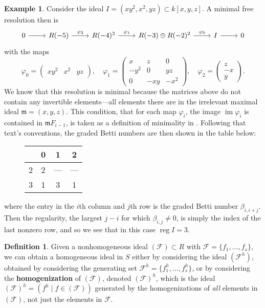 \documentclass[11pt]{article}
\newcommand{\F}{\mathcal{F}}
\DeclareMathOperator{\reg}{reg}
\DeclareMathOperator{\im}{im}
\theoremstyle{definition}
\newtheorem{definition}{Definition}
\newtheorem{example}{Example}
\begin{document}
\begin{example}
	Consider the ideal $I = (xy^2, x^2, yz) \subset k[x,y,z]$. A minimal free resolution then is \[ \begin{tikzcd}
		0 \arrow[r] & R(-5) \arrow[r, "\varphi_2"] & R(-4)^3 \arrow[r, "\varphi_1"] & R(-3) \oplus R(-2)^2 \arrow[r, "\varphi_0"] & I \arrow[r] & 0
	\end{tikzcd} \] with the maps \[ \varphi_0 = \begin{pmatrix}
		xy^2 & x^2 & yz
	\end{pmatrix}, \quad \varphi_1 = \begin{pmatrix}
		x & z & 0 \\
		-y^2 & 0 & yz \\
		0 & -xy & -x^2
	\end{pmatrix}, \quad \varphi_2 = \begin{pmatrix}
		z \\
		-x \\
		y
	\end{pmatrix}. \] We know that this resolution is minimal because the matrices above do not contain any invertible elements---all elements there are in the irrelevant maximal ideal $\mathfrak{m} = (x,y,z)$. This condition, that for each map $\varphi_i$, the image $\im \varphi_i$ is contained in $\mathfrak{m} F_{i-1}$, is taken as a definition of minimality in \cite{eisenbud2005geometry}. Following that text's conventions, the graded Betti numbers are then shown in the table below: \begin{figure}[H]
		\centering
		\begin{tabular}{c|ccc}
			& 0 & 1 & 2 \\
			\hline
			2 & 2 & --- & --- \\
			3 & 1 & 3 & 1
		\end{tabular}
	\end{figure} \noindent where the entry in the $i$th column and $j$th row is the graded Betti number $\beta_{i,i + j}$. Then the regularity, the largest $j - i$ for which $\beta_{i,j} \neq 0$, is simply the index of the last nonzero row, and so we see that in this case $\reg I = 3$. 
\end{example} 


\begin{definition}
	Given a nonhomogeneous ideal $(\F) \subset R$ with $\F = \{f_1, \dots, f_s\}$, we can obtain a homogeneous ideal in $S$ either by considering the ideal $(\F^h)$, obtained by considering the generating set $\F^h = \{f_1^h, \dots, f_s^h\}$, or by considering the \textbf{homogenization} of $(\F)$, denoted $(\F)^h$, which is the ideal $(\F)^h = (f^h \mid f \in (\F))$ generated by the homogenizations of \emph{all} elements in $(\F)$, not just the elements in $\F$. 
\end{definition}
\end{document}
